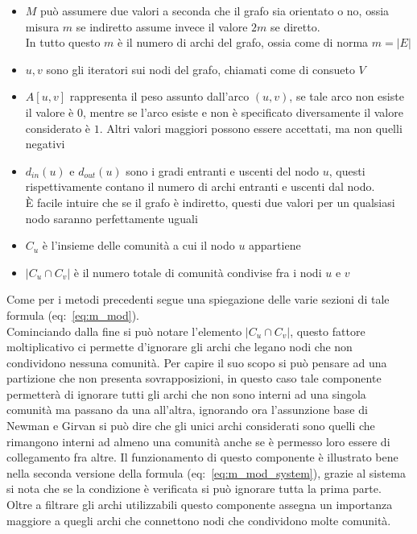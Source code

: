 \begin{itemize}
	\item $M$ può assumere due valori a seconda che il grafo sia orientato o no, ossia misura $m$ se indiretto assume invece il valore $2m$ se diretto.\\
	In tutto questo $m$ è il numero di archi del grafo, ossia come di norma $m=|E|$
	\item $u,v$ sono gli iteratori sui nodi del grafo, chiamati come di consueto $V$
	\item $A \left[ u,v \right]$ rappresenta il peso assunto dall'arco $(u, v)$, se tale arco non esiste il valore è $0$, mentre se l'arco esiste e non è specificato diversamente il valore considerato è $1$. Altri valori maggiori possono essere accettati, ma non quelli negativi
	\item $d_{in}\left(u\right)$ e $d_{out}\left(u\right)$ sono i gradi entranti e uscenti del nodo $u$, questi rispettivamente contano il numero di archi entranti e uscenti dal nodo.\\
	È facile intuire che se il grafo è indiretto, questi due valori per un qualsiasi nodo saranno perfettamente uguali
	\item $C_u$ è l'insieme delle comunità a cui il nodo $u$ appartiene
	\item $|C_u \cap C_v|$ è il numero totale di comunità condivise fra i nodi $u$ e $v$
\end{itemize}
%
Come per i metodi precedenti segue una spiegazione delle varie sezioni di tale formula (eq:~\ref{eq:m_mod}).\\
Cominciando dalla fine si può notare l'elemento $\displaystyle |C_u \cap C_v|$, questo fattore moltiplicativo ci permette d'ignorare gli archi che legano nodi che non condividono nessuna comunità. Per capire il suo scopo si può pensare ad una partizione che non presenta sovrapposizioni, in questo caso tale componente permetterà di ignorare tutti gli archi che non sono interni ad una singola comunità ma passano da una all'altra, ignorando ora l'assunzione base di Newman e Girvan si può dire che gli unici archi considerati sono quelli che rimangono interni ad almeno una comunità anche se è permesso loro essere di collegamento fra altre. Il funzionamento di questo componente è illustrato bene nella seconda versione della formula (eq:~\ref{eq:m_mod_system}), grazie al sistema si nota che se la condizione è verificata si può ignorare tutta la prima parte.\\
Oltre a filtrare gli archi utilizzabili questo componente assegna un importanza maggiore a quegli archi che connettono nodi che condividono molte comunità.\\
